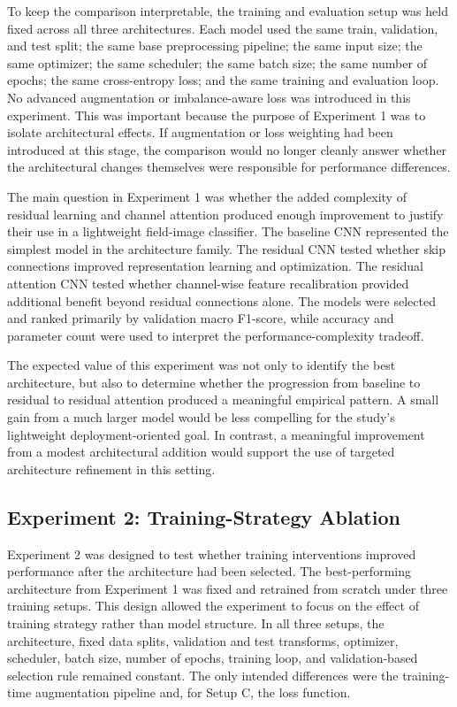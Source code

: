 \documentclass[11pt]{article}
\begin{document}
To keep the comparison interpretable, the training and evaluation setup was held fixed across all three architectures. Each model used the same train, validation, and test split; the same base preprocessing pipeline; the same input size; the same optimizer; the same scheduler; the same batch size; the same number of epochs; the same cross-entropy loss; and the same training and evaluation loop. No advanced augmentation or imbalance-aware loss was introduced in this experiment. This was important because the purpose of Experiment 1 was to isolate architectural effects. If augmentation or loss weighting had been introduced at this stage, the comparison would no longer cleanly answer whether the architectural changes themselves were responsible for performance differences.

The main question in Experiment 1 was whether the added complexity of residual learning and channel attention produced enough improvement to justify their use in a lightweight field-image classifier. The baseline CNN represented the simplest model in the architecture family. The residual CNN tested whether skip connections improved representation learning and optimization. The residual attention CNN tested whether channel-wise feature recalibration provided additional benefit beyond residual connections alone. The models were selected and ranked primarily by validation macro F1-score, while accuracy and parameter count were used to interpret the performance-complexity tradeoff.

The expected value of this experiment was not only to identify the best architecture, but also to determine whether the progression from baseline to residual to residual attention produced a meaningful empirical pattern. A small gain from a much larger model would be less compelling for the study's lightweight deployment-oriented goal. In contrast, a meaningful improvement from a modest architectural addition would support the use of targeted architecture refinement in this setting.

\subsection{Experiment 2: Training-Strategy Ablation}

Experiment 2 was designed to test whether training interventions improved performance after the architecture had been selected. The best-performing architecture from Experiment 1 was fixed and retrained from scratch under three training setups. This design allowed the experiment to focus on the effect of training strategy rather than model structure. In all three setups, the architecture, fixed data splits, validation and test transforms, optimizer, scheduler, batch size, number of epochs, training loop, and validation-based selection rule remained constant. The only intended differences were the training-time augmentation pipeline and, for Setup C, the loss function.
\end{document}
